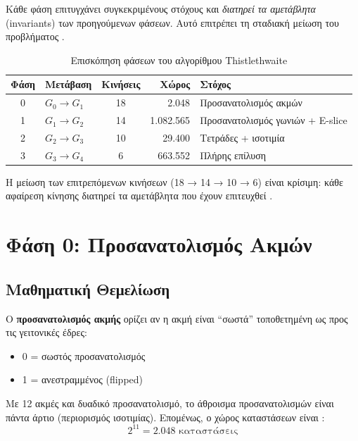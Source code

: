 Κάθε φάση επιτυγχάνει συγκεκριμένους στόχους και \textit{διατηρεί τα αμετάβλητα} (invariants) των προηγούμενων φάσεων. Αυτό επιτρέπει τη σταδιακή μείωση του προβλήματος \cite{scherphuis_thistlethwaite_summary,kociemba_twophase_details}.

\begin{table}[h]
\centering
\caption{Επισκόπηση φάσεων του αλγορίθμου Thistlethwaite}
\label{tab:thistlethwaite_phases}
\begin{tabular}{clcrl}
\toprule
\textbf{Φάση} & \textbf{Μετάβαση} & \textbf{Κινήσεις} & \textbf{Χώρος} & \textbf{Στόχος} \\
\midrule
0 & $G_0 \to G_1$ & 18 & 2.048 & Προσανατολισμός ακμών \\
1 & $G_1 \to G_2$ & 14 & 1.082.565 & Προσανατολισμός γωνιών + E-slice \\
2 & $G_2 \to G_3$ & 10 & 29.400 & Τετράδες + ισοτιμία \\
3 & $G_3 \to G_4$ & 6 & 663.552 & Πλήρης επίλυση \\
\bottomrule
\end{tabular}
\end{table}

Η μείωση των επιτρεπόμενων κινήσεων (18 → 14 → 10 → 6) είναι κρίσιμη: κάθε αφαίρεση κίνησης διατηρεί τα αμετάβλητα που έχουν επιτευχθεί \cite{scherphuis_thistlethwaite_summary,kociemba_twophase_details}.


\section{Φάση 0: Προσανατολισμός Ακμών}
\label{sec:phase0}

\subsection{Μαθηματική Θεμελίωση}

Ο \textbf{προσανατολισμός ακμής} ορίζει αν η ακμή είναι ``σωστά'' τοποθετημένη ως προς τις γειτονικές έδρες:
\begin{itemize}
    \item 0 = σωστός προσανατολισμός
    \item 1 = ανεστραμμένος (flipped)
\end{itemize}

Με 12 ακμές και δυαδικό προσανατολισμό, το άθροισμα προσανατολισμών είναι πάντα άρτιο (περιορισμός ισοτιμίας). Επομένως, ο χώρος καταστάσεων είναι \cite{scherphuis_thistlethwaite_summary}:
\begin{equation}
    2^{11} = 2.048 \text{ καταστάσεις}
\end{equation}

